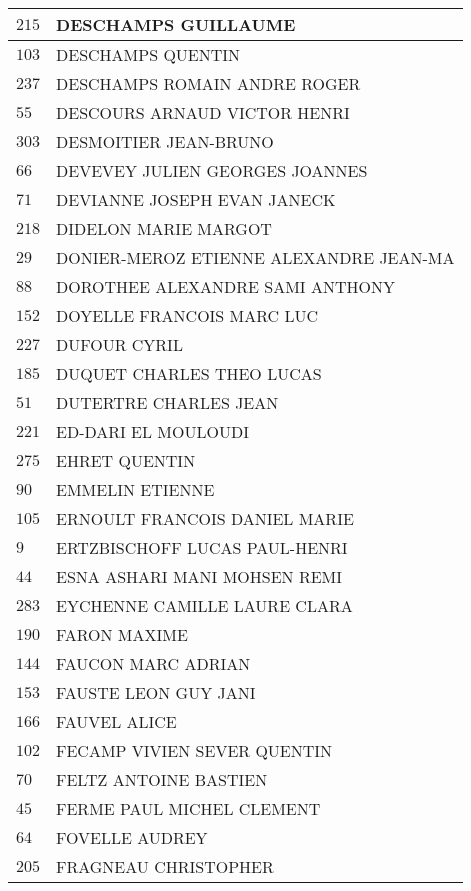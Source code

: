 \begin{xltabular}{\linewidth}{|l|X|}
    $215$ & DESCHAMPS GUILLAUME \\
    \hline
    $103$ & DESCHAMPS QUENTIN \\
    \hline
    $237$ & DESCHAMPS ROMAIN ANDRE ROGER \\
    \hline
    $55$ & DESCOURS ARNAUD VICTOR HENRI \\
    \hline
    $303$ & DESMOITIER JEAN-BRUNO \\
    \hline
    $66$ & DEVEVEY JULIEN GEORGES JOANNES \\
    \hline
    $71$ & DEVIANNE JOSEPH EVAN JANECK \\
    \hline
    $218$ & DIDELON MARIE MARGOT \\
    \hline
    $29$ & DONIER-MEROZ ETIENNE ALEXANDRE JEAN-MA \\
    \hline
    $88$ & DOROTHEE ALEXANDRE SAMI ANTHONY \\
    \hline
    $152$ & DOYELLE FRANCOIS MARC LUC \\
    \hline
    $227$ & DUFOUR CYRIL \\
    \hline
    $185$ & DUQUET CHARLES THEO LUCAS \\
    \hline
    $51$ & DUTERTRE CHARLES JEAN \\
    \hline
    $221$ & ED-DARI EL MOULOUDI \\
    \hline
    $275$ & EHRET QUENTIN \\
    \hline
    $90$ & EMMELIN ETIENNE \\
    \hline
    $105$ & ERNOULT FRANCOIS DANIEL MARIE \\
    \hline
    $9$ & ERTZBISCHOFF LUCAS PAUL-HENRI \\
    \hline
    $44$ & ESNA ASHARI MANI MOHSEN REMI \\
    \hline
    $283$ & EYCHENNE CAMILLE LAURE CLARA \\
    \hline
    $190$ & FARON MAXIME \\
    \hline
    $144$ & FAUCON MARC ADRIAN \\
    \hline
    $153$ & FAUSTE LEON GUY JANI \\
    \hline
    $166$ & FAUVEL ALICE \\
    \hline
    $102$ & FECAMP VIVIEN SEVER QUENTIN \\
    \hline
    $70$ & FELTZ ANTOINE BASTIEN \\
    \hline
    $45$ & FERME PAUL MICHEL CLEMENT \\
    \hline
    $64$ & FOVELLE AUDREY \\
    \hline
    $205$ & FRAGNEAU CHRISTOPHER \\

\end{xltabular}
